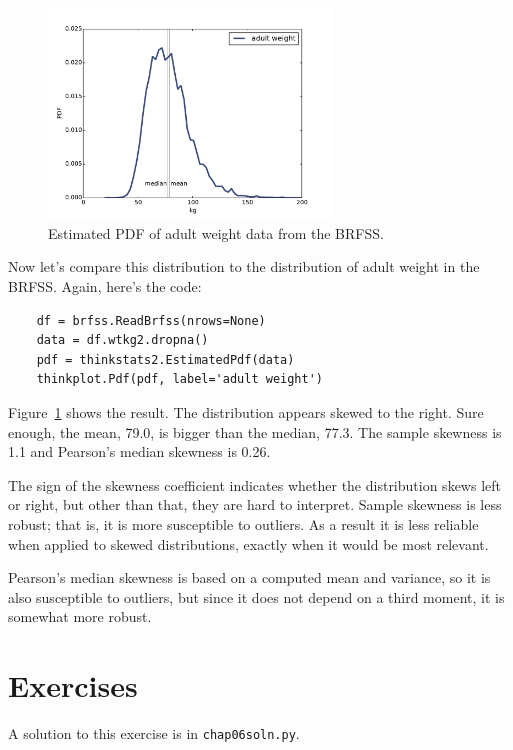 \documentclass[12pt]{book}
\begin{document}
\begin{figure}
\centerline{\includegraphics[height=2.2in]{figs/density_wtkg2_kde.pdf}}
\caption{Estimated PDF of adult weight data from the BRFSS.}
\label{density_wtkg2_kde}
\end{figure}

Now let's compare this distribution to the distribution of adult
weight in the BRFSS.  Again, here's the code:

\begin{verbatim}
    df = brfss.ReadBrfss(nrows=None)
    data = df.wtkg2.dropna()
    pdf = thinkstats2.EstimatedPdf(data)
    thinkplot.Pdf(pdf, label='adult weight')
\end{verbatim}

Figure~\ref{density_wtkg2_kde} shows the result.  The distribution
appears skewed to the right.  Sure enough, the mean, 79.0, is bigger
than the median, 77.3.  The sample skewness is 1.1 and Pearson's
median skewness is 0.26.

The sign of the skewness coefficient indicates whether the distribution
skews left or right, but other than that, they are hard to interpret.
Sample skewness is less robust; that is, it is more
susceptible to outliers.  As a result it is less reliable
when applied to skewed distributions, exactly when it would be most
relevant.

Pearson's median skewness is based on a computed mean and variance,
so it is also susceptible to outliers, but since it does not depend
on a third moment, it is somewhat more robust.


\section{Exercises}

A solution to this exercise is in \verb"chap06soln.py".
\end{document}

